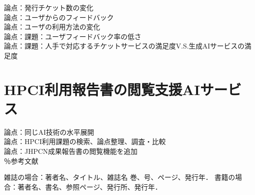 \documentclass{jsaxiesproc}
\begin{document}
論点：発行チケット数の変化\\
論点：ユーザからのフィードバック\\
論点：ユーザの利用方法の変化\\
論点：課題：ユーザフィードバック率の低さ\\
論点：課題：人手で対応するチケットサービスの満足度V.S.生成AIサービスの満足度\\


\section{HPCI利用報告書の閲覧支援AIサービス}
論点：同じAI技術の水平展開\\
論点：HPCI利用課題の検索、論点整理、調査・比較\\
論点：JHPCN成果報告書の閲覧機能を追加\\


％参考文献
\begin{thebibliography}{99}
	 雑誌の場合：著者名、タイトル、雑誌名 巻、号、ページ、発行年．
	 書籍の場合：著者名、書名、参照ページ、発行所、発行年．
\end{thebibliography}
\end{document}

